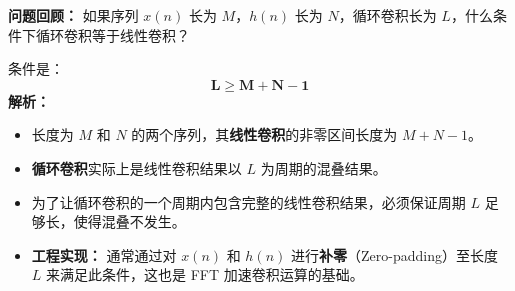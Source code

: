 \documentclass[12pt, a4paper]{article}
\begin{document}
	\textbf{问题回顾：} 如果序列 $x(n)$ 长为 $M$，$h(n)$ 长为 $N$，循环卷积长为 $L$，什么条件下循环卷积等于线性卷积？

	\begin{tcolorbox}[title=回答要点, breakable]
		条件是：
		\[ \mathbf{L \ge M + N - 1} \]
		\textbf{解析：}
		\begin{itemize}
			\item 长度为 $M$ 和 $N$ 的两个序列，其\textbf{线性卷积}的非零区间长度为 $M + N - 1$。
			\item \textbf{循环卷积}实际上是线性卷积结果以 $L$ 为周期的混叠结果。
			\item 为了让循环卷积的一个周期内包含完整的线性卷积结果，必须保证周期 $L$ 足够长，使得混叠不发生。
			\item \textbf{工程实现：} 通常通过对 $x(n)$ 和 $h(n)$ 进行\textbf{补零}（Zero-padding）至长度 $L$ 来满足此条件，这也是 FFT 加速卷积运算的基础。
		\end{itemize}
	\end{tcolorbox}
\end{document}
